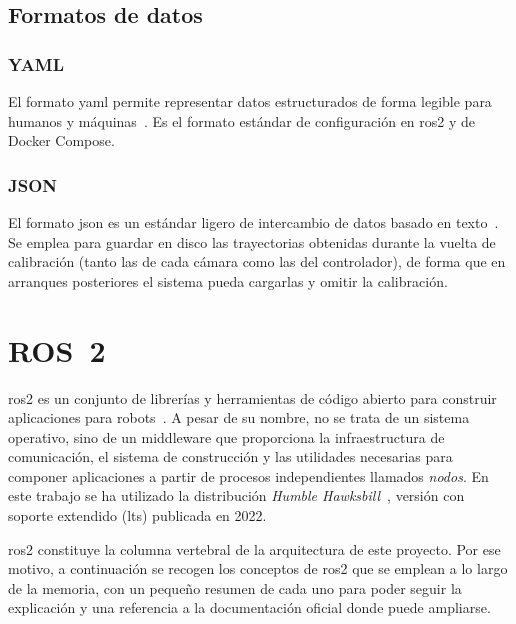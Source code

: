 \subsection{Formatos de datos}

\subsubsection{YAML}

El formato \gls{yaml} permite representar datos estructurados de forma legible para humanos y máquinas~\cite{yaml}. Es el formato estándar de configuración en \gls{ros2} y de Docker Compose. %

\subsubsection{JSON}

El formato \gls{json} es un estándar ligero de intercambio de datos basado en texto~\cite{json}. Se emplea para guardar en disco las trayectorias obtenidas durante la vuelta de calibración (tanto las de cada cámara como las del controlador), de forma que en arranques posteriores el sistema pueda cargarlas y omitir la calibración.

\section{ROS~2}
\label{sec:ros2}

\gls{ros2} es un conjunto de librerías y herramientas de código abierto para construir aplicaciones para robots~\cite{ros2docs}. A pesar de su nombre, no se trata de un sistema operativo, sino de un middleware que proporciona la infraestructura de comunicación, el sistema de construcción y las utilidades necesarias para componer aplicaciones a partir de procesos independientes llamados \textit{nodos}. En este trabajo se ha utilizado la distribución \textit{Humble Hawksbill}~\cite{ros2docs}, versión con soporte extendido (\gls{lts}) publicada en 2022.

\gls{ros2} constituye la columna vertebral de la arquitectura de este proyecto. Por ese motivo, a continuación se recogen los conceptos de \gls{ros2} que se emplean a lo largo de la memoria, con un pequeño resumen de cada uno para poder seguir la explicación y una referencia a la documentación oficial donde puede ampliarse.

